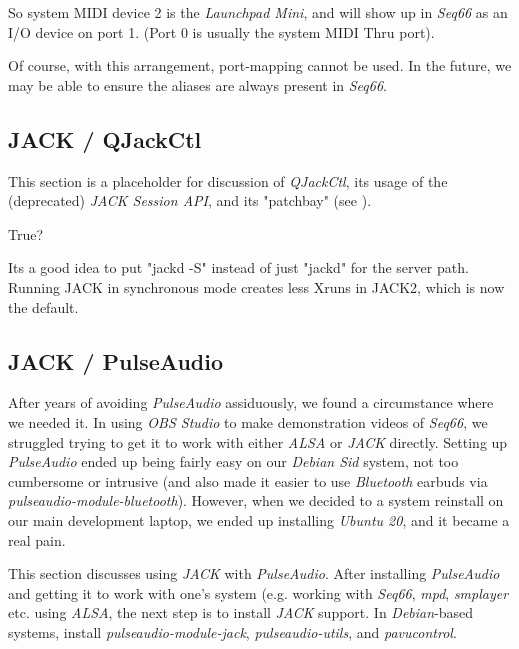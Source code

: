    So system MIDI device 2 is the \textsl{Launchpad Mini}, and
   will show up in \textsl{Seq66} as an I/O device on port 1.
   (Port 0 is usually the system MIDI Thru port).

   Of course, with this arrangement, port-mapping cannot be used.
   In the future, we may be able to ensure the aliases are always
   present in \textsl{Seq66}.

\subsection{JACK / QJackCtl}
\label{subsec:jack_qjackctl}

   This section is a placeholder for discussion of \textsl{QJackCtl},
   its usage of the (deprecated) \textsl{JACK Session API}, and
   its "patchbay" (see \cite{patchbay}).

   True?

   Its a good idea to put "jackd -S" instead of just "jackd" for the server
   path. Running JACK in synchronous mode creates less Xruns in JACK2, which
   is now the default.

\subsection{JACK / PulseAudio}
\label{subsec:jack_pulseaudio}

   After years of avoiding \textsl{PulseAudio} assiduously, we found a
   circumstance where we needed it.
   In using \textsl{OBS Studio} to make demonstration videos of \textsl{Seq66},
   we struggled trying to get it to work with either
   \textsl{ALSA} or \textsl{JACK} directly.
   Setting up \textsl{PulseAudio} ended up being fairly easy on our
   \textsl{Debian Sid} system, not too
   cumbersome or intrusive (and also made it easier to use
   \textsl{Bluetooth} earbuds via \textsl{pulseaudio-module-bluetooth}).
   However, when we decided to a system reinstall on our main development
   laptop, we ended up installing \textsl{Ubuntu 20}, and it became a real
   pain.

   This section discusses using \textsl{JACK} with \textsl{PulseAudio}.
   After installing \textsl{PulseAudio} and getting it to work with one's
   system (e.g. working with \textsl{Seq66}, \textsl{mpd},
   \textsl{smplayer} etc. using \textsl{ALSA},
   the next step is to install \textsl{JACK} support.
   In \textsl{Debian}-based systems, install \textsl{pulseaudio-module-jack},
   \textsl{pulseaudio-utils}, and \textsl{pavucontrol}.

